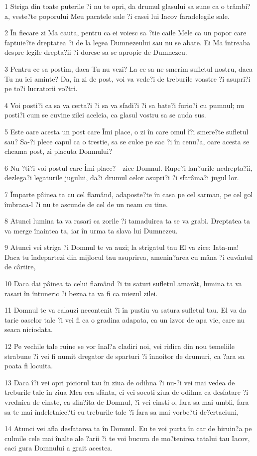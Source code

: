 \par 1 Striga din toate puterile ?i nu te opri, da drumul glasului sa sune ca o trâmbi?a, veste?te poporului Meu pacatele sale ?i casei lui Iacov faradelegile sale.
\par 2 În fiecare zi Ma cauta, pentru ca ei voiesc sa ?tie caile Mele ca un popor care faptuie?te dreptatea ?i de la legea Dumnezeului sau nu se abate. Ei Ma întreaba despre legile drepta?ii ?i doresc sa se apropie de Dumnezeu.
\par 3 Pentru ce sa postim, daca Tu nu vezi? La ce sa ne smerim sufletul nostru, daca Tu nu iei aminte? Da, în zi de post, voi va vede?i de treburile voastre ?i asupri?i pe to?i lucratorii vo?tri.
\par 4 Voi posti?i ca sa va certa?i ?i sa va sfadi?i ?i sa bate?i furio?i cu pumnul; nu posti?i cum se cuvine zilei aceleia, ca glasul vostru sa se auda sus.
\par 5 Este oare acesta un post care Îmi place, o zi în care omul î?i smere?te sufletul sau? Sa-?i plece capul ca o trestie, sa se culce pe sac ?i în cenu?a, oare acesta se cheama post, zi placuta Domnului?
\par 6 Nu ?ti?i voi postul care Îmi place? - zice Domnul. Rupe?i lan?urile nedrepta?ii, dezlega?i legaturile jugului, da?i drumul celor asupri?i ?i sfarâma?i jugul lor.
\par 7 Împarte pâinea ta cu cel flamând, adaposte?te în casa pe cel sarman, pe cel gol îmbraca-l ?i nu te ascunde de cel de un neam cu tine.
\par 8 Atunci lumina ta va rasari ca zorile ?i tamaduirea ta se va grabi. Dreptatea ta va merge înaintea ta, iar în urma ta slava lui Dumnezeu.
\par 9 Atunci vei striga ?i Domnul te va auzi; la strigatul tau El va zice: Iata-ma! Daca tu îndepartezi din mijlocul tau asuprirea, amenin?area cu mâna ?i cuvântul de cârtire,
\par 10 Daca dai pâinea ta celui flamând ?i tu saturi sufletul amarât, lumina ta va rasari în întuneric ?i bezna ta va fi ca miezul zilei.
\par 11 Domnul te va calauzi necontenit ?i în pustiu va satura sufletul tau. El va da tarie oaselor tale ?i vei fi ca o gradina adapata, ca un izvor de apa vie, care nu seaca niciodata.
\par 12 Pe vechile tale ruine se vor înal?a cladiri noi, vei ridica din nou temeliile strabune ?i vei fi numit dregator de sparturi ?i înnoitor de drumuri, ca ?ara sa poata fi locuita.
\par 13 Daca î?i vei opri piciorul tau în ziua de odihna ?i nu-?i vei mai vedea de treburile tale în ziua Mea cea sfânta, ci vei socoti ziua de odihna ca desfatare ?i vrednica de cinste, ca sfin?ita de Domnul, ?i vei cinsti-o, fara sa mai umbli, fara sa te mai îndeletnice?ti cu treburile tale ?i fara sa mai vorbe?ti de?ertaciuni,
\par 14 Atunci vei afla desfatarea ta în Domnul. Eu te voi purta în car de biruin?a pe culmile cele mai înalte ale ?arii ?i te voi bucura de mo?tenirea tatalui tau Iacov, caci gura Domnului a grait acestea.

